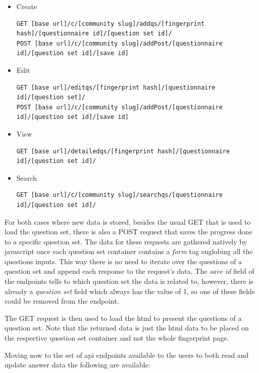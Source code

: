 \begin{itemize}
    \item Create
\begin{lstlisting}[basicstyle=\tiny]
GET [base url]/c/[community slug]/addqs/[fingerprint hash]/[questionnaire id]/[question set id]/
POST [base url]/c/[community slug]/addPost/[questionnaire id]/[question set id]/[save id]
\end{lstlisting}
    \item Edit
\begin{lstlisting}[basicstyle=\tiny]
GET [base url]/editqs/[fingerprint hash]/[questionnaire id]/[question set]/
POST [base url]/c/[community slug]/addPost/[questionnaire id]/[question set id]/[save id]
\end{lstlisting}
    \item View
\begin{lstlisting}[basicstyle=\tiny]
GET [base url]/detailedqs/[fingerprint hash]/[questionnaire id]/[question set id]/
\end{lstlisting}
    \item Search
\begin{lstlisting}[basicstyle=\tiny]
GET [base url]/c/[community slug]/searchqs/[questionnaire id]/[question set id]/
\end{lstlisting}
\end{itemize}

For both cases where new data is stored, besides the usual GET that is used to load the question set, there is also a POST request that saves the progress done to a specific question set.
The data for these requests are gathered natively by javascript once each question set container contains a \textit{form} tag englobing all the questions inputs.
This way there is no need to iterate over the questions of a question set and append each response to the request's data.
The \textit{save id} field of the endpoints tells to which question set the data is related to, however, there is already a \textit{question set} field which always has the value of 1, so one of these fields could be removed from the endpoint.

The GET request is then used to load the \gls{html} to present the questions of a question set.
Note that the returned data is just the \gls{html} data to be placed on the respective question set container and not the whole fingerprint page.

Moving now to the set of \gls{api} endpoints available to the users to both read and update answer data the following are available:

